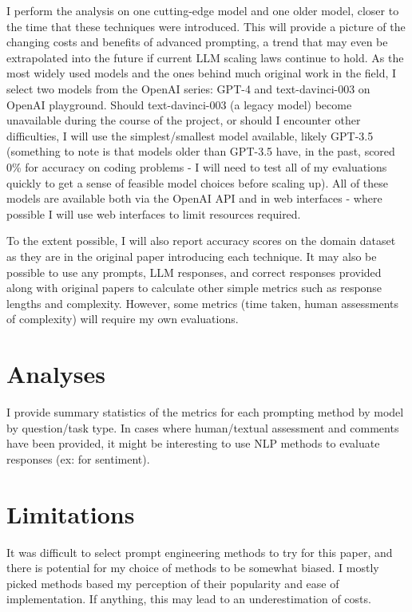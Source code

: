\documentclass[11pt]{article}
\begin{document}
I perform the analysis on one cutting-edge model and one older model, closer to the time that these techniques were introduced. This will provide a picture of the changing costs and benefits of advanced prompting, a trend that may even be extrapolated into the future if current LLM scaling laws continue to hold. As the most widely used models and the ones behind much original work in the field, I select two models from the OpenAI series: GPT-4 and text-davinci-003 on OpenAI playground. Should text-davinci-003 (a legacy model) become unavailable during the course of the project, or should I encounter other difficulties, I will use the simplest/smallest model available, likely GPT-3.5 (something to note is that models older than GPT-3.5 have, in the past, scored 0\% for accuracy on coding problems - I will need to test all of my evaluations quickly to get a sense of feasible model choices before scaling up). All of these models are available both via the OpenAI API and in web interfaces - where possible I will use web interfaces to limit resources required.

To the extent possible, I will also report accuracy scores on the domain dataset as they are in the original paper introducing each technique. It may also be possible to use any prompts, LLM responses, and correct responses provided along with original papers to calculate other simple metrics such as response lengths and complexity. However, some metrics (time taken, human assessments of complexity) will require my own evaluations.

\section*{Analyses}

I provide summary statistics of the metrics for each prompting method by model by question/task type. In cases where human/textual assessment and comments have been provided, it might be interesting to use NLP methods to evaluate responses (ex: for sentiment).

\section*{Limitations}

It was difficult to select prompt engineering methods to try for this paper, and there is potential for my choice of methods to be somewhat biased. I mostly picked methods based my perception of their popularity and ease of implementation. If anything, this may lead to an underestimation of costs.
\end{document}
